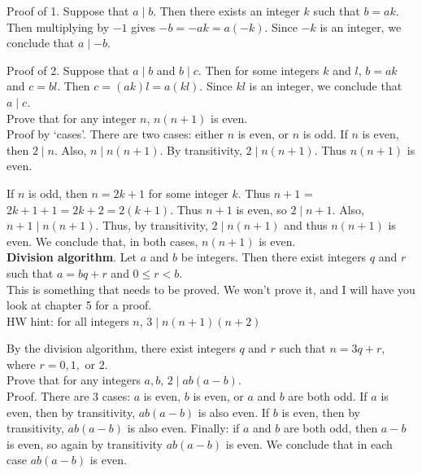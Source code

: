 \documentclass{article}
\begin{document}
Proof of 1. Suppose that $a \mid b$. Then there exists an integer $k$ such that $b = ak$. Then multiplying by $-1$ gives $-b = -ak = a(-k)$. Since $-k$ is an integer, we conclude that $a \mid -b$.

Proof of 2. Suppose that $a \mid b$ and $b \mid c$. Then for some integers $k$ and $l$, $b = ak$ and $c = bl$. Then $c = (ak)l = a(kl)$. Since $kl$ is an integer, we conclude that $a \mid c$.
\\

Prove that for any integer $n$, $n(n+1)$ is even.
\\

Proof by `cases'. There are two cases: either $n$ is even, or $n$ is odd. If $n$ is even, then $2 \mid n$. Also, $n \mid n(n+1)$. By transitivity, $2 \mid n(n+1)$. Thus $n(n+1)$ is even. 

If $n$ is odd, then $n = 2k+1$ for some integer $k$. Thus $n+1$ = $2k+1 +1 = 2k+2 = 2(k+1)$. Thus $n+1$ is even, so $2 \mid n+1$. Also, $n+1 \mid n(n+1)$. Thus, by transitivity, $2 \mid n(n+1)$ and thus $n(n+1)$ is even. We conclude that, in both cases, $n(n+1)$ is even.
\\

\textbf{Division algorithm}. Let $a$ and $b$ be integers. Then there exist integers $q$ and $r$ such that $a = bq + r$ and $0 \leq r < b$.
\\

This is something that needs to be proved. We won't prove it, and I will have you look at chapter 5 for a proof.
\\ 

HW hint: for all integers $n$, $3 \mid n(n+1)(n+2)$

By the division algorithm, there exist integers $q$ and $r$ such that $n = 3q + r$, where $r = 0, 1,$ or $2$.
\\

Prove that for any integers $a,b$, $2 \mid ab(a-b)$. 
\\

Proof. There are 3 cases: $a$ is even, $b$ is even, or $a$ and $b$ are both odd. If $a$ is even, then by transitivity, $ab(a-b)$ is also even.
If $b$ is even, then by transitivity, $ab(a-b)$ is also even. Finally: if $a$ and $b$ are both odd, then $a-b$ is even, so again by transitivity $ab(a-b)$ is even. We conclude that in each case $ab(a-b)$ is even.
\end{document}
